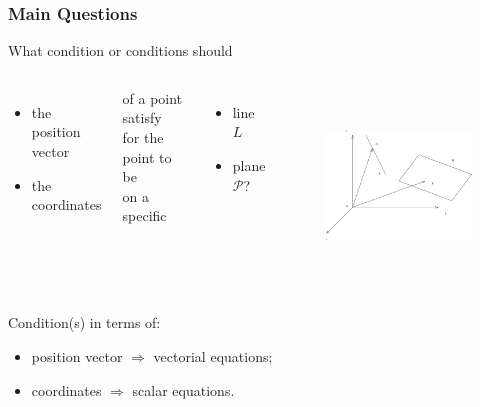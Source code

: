 
\begin{frame}
 \frametitle{Main Questions}

What condition or conditions should

\begin{columns}[t]
  \column[T]{5cm}
  \begin{itemize}
    \item the position vector
    \item the coordinates
  \end{itemize}

of a point satisfy\\
for the point to be\\
on a specific\\

\begin{itemize}
    \item line $L$
    \item plane $\mathcal{P}$?
\end{itemize}
  \column[T]{7cm}
    \begin{figure}
        \includegraphics[height=2in]{../images/ok-lines_planes.eps}
    \end{figure}
\end{columns}

Condition(s) in terms of:
\begin{itemize}
    \item position vector $\Rightarrow$ vectorial equations;
    \item coordinates $\Rightarrow$ scalar equations.
\end{itemize}
\end{frame}



